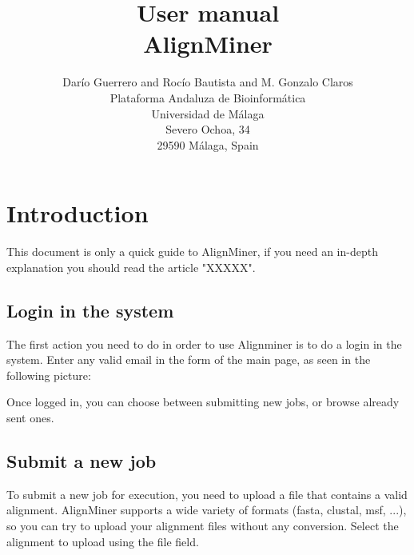 \documentclass[12pt,oneside,a4paper,english]{article}  %
\title{User manual\\AlignMiner}
\author{Darío Guerrero and 
         Rocío Bautista and 
         M. Gonzalo Claros \\
         Plataforma Andaluza de Bioinformática\\ Universidad de Málaga\\ Severo Ochoa, 34\\ 29590 Málaga, Spain
      }
\begin{document}
	


\maketitle



\section{Introduction}\label{sec:introduction} %

This document is only a quick guide to AlignMiner, if you need an in-depth explanation you should read the article "XXXXX".





\subsection{Login in the system}

The first action you need to do in order to use Alignminer is to do a login in the system. Enter any valid email in the form of the main page, as seen in the following picture:


Once logged in, you can choose between submitting new jobs, or browse already sent ones.

\subsection{Submit a new job}

To submit a new job for execution, you need to upload a file that contains a valid alignment. AlignMiner supports a wide variety of formats (fasta, clustal, msf, ...), so you can try to upload your alignment files without any conversion. Select the alignment to upload using the file field.
\end{document}
